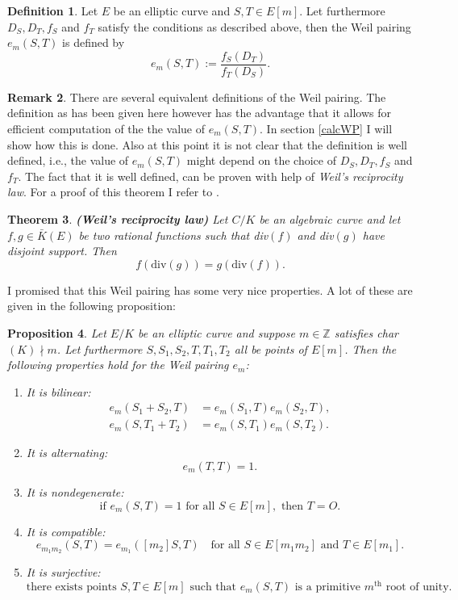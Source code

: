 \documentclass{article}
\numberwithin{equation}{section}
\newtheorem{theorem}{Theorem}[subsection]
\newtheorem{proposition}[theorem]{Proposition}
\theoremstyle{definition}
\newtheorem{definition}[theorem]{Definition}
\newtheorem{remark}[theorem]{Remark}
\newcommand{\ZZ}{{\mathbb Z}} %
\begin{document}
\begin{definition}
Let $E$ be an elliptic curve and $S,T \in E[m]$. Let furthermore $D_S,D_T,f_S$ and $f_T$ satisfy the conditions as described above, then the Weil pairing $e_m(S,T)$ is defined by $$e_m(S,T):=\frac{f_S(D_T)}{f_T(D_S)}.$$
\end{definition}

\begin{remark}
There are several equivalent definitions of the Weil pairing. The definition as has been given here however has the advantage that it allows for efficient computation of the the value of $e_m(S,T)$. In section \ref{calcWP} I will show how this is done. Also at this point it is not clear that the definition is well defined, i.e., the value of $e_m(S,T)$ might depend on the choice of $D_S,D_T,f_S$ and $f_T$. The fact that it is well defined, can be proven with help of \emph{Weil's reciprocity law}. For a proof of this theorem I refer to \cite{Milleralg}.
\end{remark}

\begin{theorem}\label{Wreciprocity}
{\bf (Weil's reciprocity law)} Let $C/K$ be an algebraic curve and let $f,g \in \bar{K}(E)$ be two rational functions such that div$(f)$ and div$(g)$ have disjoint support. Then $$f(\text{div}(g))=g(\text{div}(f)).$$
\end{theorem}

I promised that this Weil pairing has some very nice properties. A lot of these are given in the following proposition:

\begin{proposition}\label{weilpairing}
Let $E/K$ be an elliptic curve and suppose $m\in\ZZ$ satisfies char$(K)\nmid m$. Let furthermore $S,S_1,S_2,T,T_1,T_2$ all be points of $E[m]$. Then the following properties hold for the Weil pairing $e_m$:
\begin{enumerate}
\item It is \emph{bilinear}: 
\begin{align*}
e_m(S_1+S_2,T)&=e_m(S_1,T)e_m(S_2,T),\\
e_m(S,T_1+T_2)&=e_m(S,T_1)e_m(S,T_2).
\end{align*}
\item It is \emph{alternating}: $$e_m(T,T)=1.$$
\item It is \emph{nondegenerate}: $$\text{if } e_m(S,T)=1 \text{ for all } S \in E[m], \text{ then } T=O.$$
\item It is \emph{compatible}: $$e_{m_1m_2}(S,T)=e_{m_1}([m_2]S,T) \quad \text{for all } S \in E[m_1m_2] \text{ and } T \in E[m_1].$$
\item It is \emph{surjective}: $$\text{there exists points } S,T \in E[m] \text{ such that } e_m(S,T) \text{ is a primitive } m^\text{th} \text{ root of unity.}$$
\end{enumerate}
\end{proposition}
\end{document}
